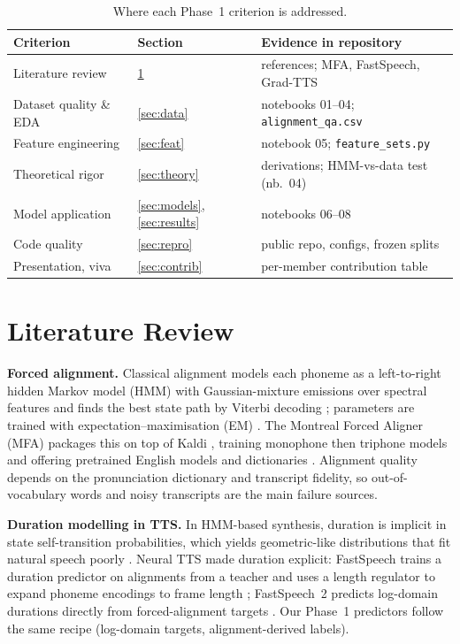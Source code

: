 \documentclass[conference]{IEEEtran}
\begin{document}
\begin{table}[t]\centering\caption{Where each Phase~1 criterion is addressed.}\label{tab:map}
\footnotesize
\begin{tabular}{@{}p{2.5cm}p{1.2cm}p{3.9cm}@{}}
\toprule
Criterion & Section & Evidence in repository \\ \midrule
Literature review & \ref{sec:lit} & references; MFA, FastSpeech, Grad-TTS \\
Dataset quality \& EDA & \ref{sec:data} & notebooks 01--04; \texttt{alignment\_qa.csv} \\
Feature engineering & \ref{sec:feat} & notebook 05; \texttt{feature\_sets.py} \\
Theoretical rigor & \ref{sec:theory} & derivations; HMM-vs-data test (nb.~04) \\
Model application & \ref{sec:models},\ref{sec:results} & notebooks 06--08 \\
Code quality & \ref{sec:repro} & public repo, configs, frozen splits \\
Presentation, viva & \ref{sec:contrib} & per-member contribution table \\ \bottomrule
\end{tabular}
\end{table}

\section{Literature Review}\label{sec:lit}
\textbf{Forced alignment.}
Classical alignment models each phoneme as a left-to-right hidden Markov model (HMM) with Gaussian-mixture emissions over spectral features and finds the best state path by Viterbi decoding \cite{rabiner1989,viterbi1967}; parameters are trained with expectation--maximisation (EM) \cite{dempster1977}.
The Montreal Forced Aligner (MFA) packages this on top of Kaldi \cite{povey2011}, training monophone then triphone models and offering pretrained English models and dictionaries \cite{mcauliffe2017}.
Alignment quality depends on the pronunciation dictionary and transcript fidelity, so out-of-vocabulary words and noisy transcripts are the main failure sources.

\textbf{Duration modelling in TTS.}
In HMM-based synthesis, duration is implicit in state self-transition probabilities, which yields geometric-like distributions that fit natural speech poorly \cite{rabiner1989}.
Neural TTS made duration explicit: FastSpeech trains a duration predictor on alignments from a teacher and uses a length regulator to expand phoneme encodings to frame length \cite{ren2019}; FastSpeech~2 predicts log-domain durations directly from forced-alignment targets \cite{ren2021}.
Our Phase~1 predictors follow the same recipe (log-domain targets, alignment-derived labels).
\end{document}

